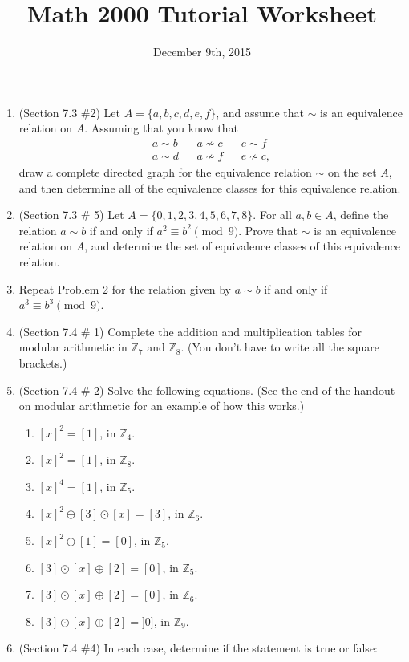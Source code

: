 \documentclass[letterpaper,12pt]{article}
\title{Math 2000 Tutorial Worksheet}
\date{December 9th, 2015}
\newcommand{\Z}{\mathbb{Z}}
\begin{document}
\maketitle

 \begin{enumerate}
  \item (Section 7.3 \#2) Let $A=\{a,b,c,d,e,f\}$, and assume that $\sim$ is an equivalence relation on $A$. Assuming that you know that
\begin{align*}
 a\sim b & & a \not\sim c & & e\sim f \\
 a\sim d & & a \not\sim f &  & e \not\sim c,
\end{align*}
draw a complete directed graph for the equivalence relation $\sim$ on the set $A$, and then determine all of the equivalence classes for this equivalence relation.
\item (Section 7.3 \# 5) Let $A = \{0, 1, 2, 3, 4, 5, 6, 7, 8\}$. For all $a,b\in A$, define the relation $a\sim b$ if and only if $a^2\equiv b^2 \pmod{9}$. Prove that $\sim$ is an equivalence relation on $A$, and determine the set of equivalence classes of this equivalence relation.
\item Repeat Problem 2 for the relation given by $a\sim b$ if and only if $a^3\equiv b^3\pmod{9}$. 
\item (Section 7.4 \# 1) Complete the addition and multiplication tables for modular arithmetic in $\Z_7$ and $\Z_8$. (You don't have to write all the square brackets.)
\item (Section 7.4 \# 2) Solve the following equations. (See the end of the handout on modular arithmetic for an example of how this works.)
\begin{multicols}{2}
 \begin{enumerate}
  \item $[x]^2=[1]$, in $\Z_4$.
  \item $[x]^2=[1]$, in $\Z_8$.
  \item $[x]^4=[1]$, in $\Z_5$.
  \item $[x]^2\oplus[3]\odot[x] = [3]$, in $\Z_6$.
  \item $[x]^2\oplus[1]=[0]$, in $\Z_5$. 
  \item $[3]\odot[x]\oplus[2] = [0]$, in $\Z_5$.
  \item $[3]\odot[x]\oplus[2] = [0]$, in $\Z_6$.
  \item $[3]\odot[x]\oplus[2] = ]0]$, in $\Z_9$.
 \end{enumerate}
\end{multicols}
\item (Section 7.4 \#4) In each case, determine if the statement is true or false:

\end{enumerate}
\end{document}
